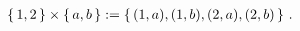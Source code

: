 \guard



\begin{exmp}
\label{exmp:cartesianProductEasy}
  \begin{align*}
    \left\{\,1,2\,\right\}\times\left\{\,a,b\,\right\} := \left\{\, (1,a),(1,b),(2,a),(2,b)\,\right\}\,.
  \end{align*}

\end{exmp}

